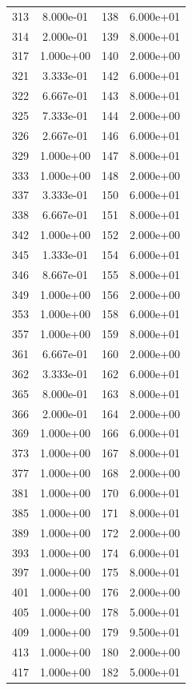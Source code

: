 \documentclass[12pt]{article}
\begin{document}
\begin{longtable}{@{}cccc@{}}
313 & 8.000e-01 & 138 & 6.000e+01 \\
314 & 2.000e-01 & 139 & 8.000e+01 \\
317 & 1.000e+00 & 140 & 2.000e+00 \\
321 & 3.333e-01 & 142 & 6.000e+01 \\
322 & 6.667e-01 & 143 & 8.000e+01 \\
325 & 7.333e-01 & 144 & 2.000e+00 \\
326 & 2.667e-01 & 146 & 6.000e+01 \\
329 & 1.000e+00 & 147 & 8.000e+01 \\
333 & 1.000e+00 & 148 & 2.000e+00 \\
337 & 3.333e-01 & 150 & 6.000e+01 \\
338 & 6.667e-01 & 151 & 8.000e+01 \\
342 & 1.000e+00 & 152 & 2.000e+00 \\
345 & 1.333e-01 & 154 & 6.000e+01 \\
346 & 8.667e-01 & 155 & 8.000e+01 \\
349 & 1.000e+00 & 156 & 2.000e+00 \\
353 & 1.000e+00 & 158 & 6.000e+01 \\
357 & 1.000e+00 & 159 & 8.000e+01 \\
361 & 6.667e-01 & 160 & 2.000e+00 \\
362 & 3.333e-01 & 162 & 6.000e+01 \\
365 & 8.000e-01 & 163 & 8.000e+01 \\
366 & 2.000e-01 & 164 & 2.000e+00 \\
369 & 1.000e+00 & 166 & 6.000e+01 \\
373 & 1.000e+00 & 167 & 8.000e+01 \\
377 & 1.000e+00 & 168 & 2.000e+00 \\
381 & 1.000e+00 & 170 & 6.000e+01 \\
385 & 1.000e+00 & 171 & 8.000e+01 \\
389 & 1.000e+00 & 172 & 2.000e+00 \\
393 & 1.000e+00 & 174 & 6.000e+01 \\
397 & 1.000e+00 & 175 & 8.000e+01 \\
401 & 1.000e+00 & 176 & 2.000e+00 \\
405 & 1.000e+00 & 178 & 5.000e+01 \\
409 & 1.000e+00 & 179 & 9.500e+01 \\
413 & 1.000e+00 & 180 & 2.000e+00 \\
417 & 1.000e+00 & 182 & 5.000e+01 \\

\end{longtable}
\end{document}
